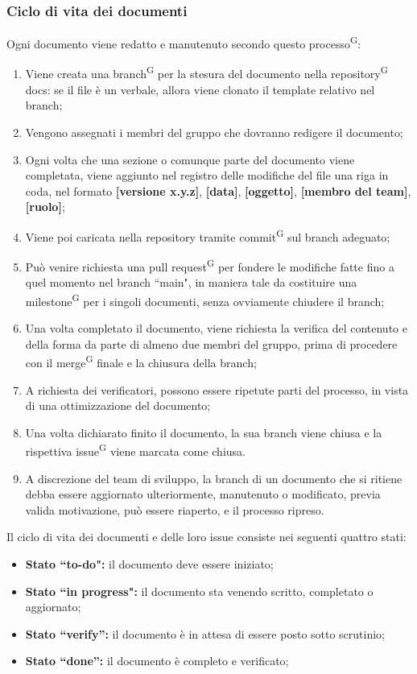\documentclass[8pt]{article}
\newcommand{\glossterm}[1]{#1\textsuperscript{G}} %
\begin{document}
\subsubsection{Ciclo di vita dei documenti}
Ogni documento viene redatto e manutenuto secondo questo \glossterm{processo}:
\begin{enumerate}
    \item Viene creata una \glossterm{branch} per la stesura del documento nella \glossterm{repository} docs: se il file è un verbale, allora viene clonato il template relativo nel branch;
    \item Vengono assegnati i membri del gruppo che dovranno redigere il documento; 
    \item Ogni volta che una sezione o comunque parte del documento viene completata, viene aggiunto
        nel registro delle modifiche del file una riga in coda, nel formato \textbf{[versione
        x.y.z]}, \textbf{[data]}, \textbf{[oggetto]}, \textbf{[membro del team]}, \textbf{[ruolo]};  
    \item Viene poi caricata nella repository tramite \glossterm{commit} sul branch adeguato;
    \item Può venire richiesta una \glossterm{pull request} per fondere le modifiche fatte fino a quel momento
        nel branch ``main", in maniera tale da costituire una \glossterm{milestone} per i singoli documenti, senza ovviamente chiudere il branch;
    \item Una volta completato il documento, viene richiesta la verifica del contenuto e della forma
        da parte di almeno due membri del gruppo, prima di procedere con il \glossterm{merge} finale e la chiusura della branch; 
    \item A richiesta dei verificatori, possono essere ripetute parti del processo, in vista di una ottimizzazione del documento;
    \item Una volta dichiarato finito il documento, la sua branch viene chiusa e la rispettiva \glossterm{issue} viene marcata come chiusa.
    \item A discrezione del team di sviluppo, la branch di un documento che si ritiene debba essere aggiornato ulteriormente, manutenuto o modificato, previa valida motivazione, può essere riaperto, e il processo ripreso. 
\end{enumerate}
Il ciclo di vita dei documenti e delle loro issue consiste nei seguenti quattro stati:
\begin{itemize} 
    \item \textbf{Stato ``to-do":} il documento deve essere iniziato;
    \item \textbf{Stato ``in progress":} il documento sta venendo scritto, completato o aggiornato;
    \item \textbf{Stato ``verify'':} il documento è in attesa di essere posto sotto scrutinio;
    \item \textbf{Stato ``done'':} il documento è completo e verificato;
\end{itemize}
\end{document}
